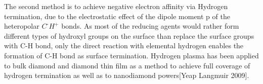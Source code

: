 The second method is to achieve negative electron affinity via Hydrogen termination, due to the electrostatic effect of the dipole moment p of the heteropolar $C^{\text{-}} H^{+}$ bonds. As most of the reducing agents would rather form different types of hydroxyl groups on the surface than replace the surface groups with C-H bond, only the direct reaction with elemental hydrogen enables the formation of C-H bond as surface termination. Hydrogen plasma has been applied to bulk diamond and diamond thin film as a method to achieve full coverage of hydrogen termination as well as to nanodiamond powers[Yeap Langmuir 2009].
